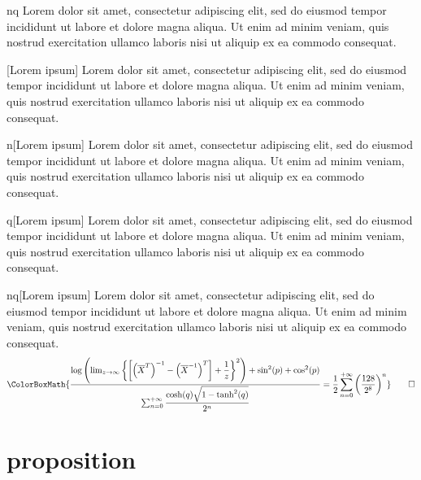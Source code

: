 \begin{theorem}{nq}
	Lorem dolor sit amet, consectetur adipiscing elit, sed do eiusmod tempor incididunt ut labore et dolore magna aliqua. Ut enim ad minim veniam, quis nostrud exercitation ullamco laboris nisi ut aliquip ex ea commodo consequat.
\end{theorem}

\begin{theorem}{}[Lorem ipsum]
	Lorem dolor sit amet, consectetur adipiscing elit, sed do eiusmod tempor incididunt ut labore et dolore magna aliqua. Ut enim ad minim veniam, quis nostrud exercitation ullamco laboris nisi ut aliquip ex ea commodo consequat.
\end{theorem}

\begin{theorem}{n}[Lorem ipsum]
	Lorem dolor sit amet, consectetur adipiscing elit, sed do eiusmod tempor incididunt ut labore et dolore magna aliqua. Ut enim ad minim veniam, quis nostrud exercitation ullamco laboris nisi ut aliquip ex ea commodo consequat.
\end{theorem}

\begin{theorem}{q}[Lorem ipsum]
	Lorem dolor sit amet, consectetur adipiscing elit, sed do eiusmod tempor incididunt ut labore et dolore magna aliqua. Ut enim ad minim veniam, quis nostrud exercitation ullamco laboris nisi ut aliquip ex ea commodo consequat.
\end{theorem}

\begin{theorem}{nq}[Lorem ipsum]
	Lorem dolor sit amet, consectetur adipiscing elit, sed do eiusmod tempor incididunt ut labore et dolore magna aliqua. Ut enim ad minim veniam, quis nostrud exercitation ullamco laboris nisi ut aliquip ex ea commodo consequat.
	\begin{equation*}
		\ColorBoxMath{\dfrac{\log\left(\lim_{z\to\infty}\left\{\left[\left(\overline{X}^{T}\right)^{-1}-\left(\overline{X}^{-1}\right)^T\right]+\dfrac{1}{z}\right\}^2\right)+\sin^2(p)+\cos^2(p)}{\sum_{n=0}^{+\infty}\dfrac{\cosh(q)\sqrt{1-\tanh^2(q)}}{2^n}}=\dfrac{1}{2}\sum_{n=0}^{+\infty}\left(\dfrac{128}{2^8}\right)^n}\qedhere
	\end{equation*}
\end{theorem}

\newpage

\section{proposition}

